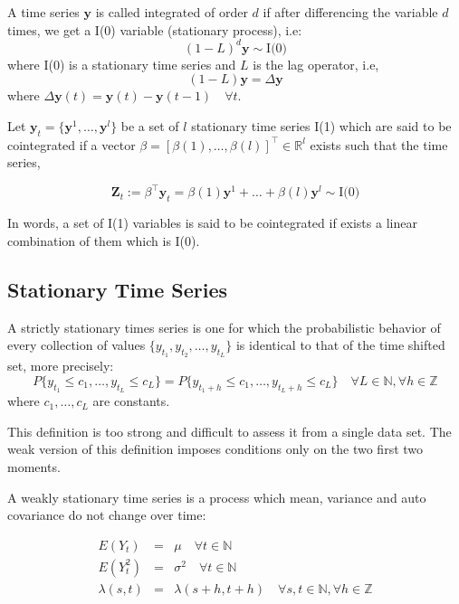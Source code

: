 A time series $\mathbf{y}$ is called integrated of order $d$ if after
differencing the variable $d$ times, we get a I(0) variable (stationary
process), i.e:
\[
(1-L)^d \mathbf{y} \sim \text{I(0)}
\]
\noindent where I(0) is a stationary time series and $L$ is the lag operator, i.e,
\[
(1-L)\mathbf{y} = \Delta \mathbf{y}
\]
\noindent where $\Delta \mathbf{y}(t) = \mathbf{y}(t)  -\mathbf{y}(t-1) \quad \forall t $.


Let $\mathbf{y}_t = \{\mathbf{y}^1, \dots, \mathbf{y}^l\}$ be a set of $l$ stationary time
series I(1) which are said to be cointegrated if a vector
$\beta=[\beta(1),\dots,\beta(l)]^\top \in \mathbb{R}^l$  exists such that the time series,

\begin{equation}
 \mathbf{Z}_t:= \beta^\top \mathbf{y}_t = \beta(1) \mathbf{y}^1 + \dots + \beta(l) \mathbf{y}^l \sim
 \text{I(0)}
\end{equation}

In words, a set of I(1) variables is said to be cointegrated if
exists a linear combination of them which is I(0).

\subsection{Stationary Time Series}

A strictly stationary times series is one for which the probabilistic behavior
of every collection of values $\{y_{t_1},y_{t_2},\dots,y_{t_L}\}$ is identical
to that of the time shifted set, more precisely: \[ P\{y_{t_1} \leq
c_1,\dots,y_{t_L} \leq c_L\} = P\{y_{t_1+h} \leq c_1,\dots,y_{t_L+h}
\leq c_L\}
\quad \forall L \in \mathbb{N}, \forall h \in \mathbb{Z}\] \noindent where
$c_1,\dots,c_L$ are constants.

This definition is too strong and difficult to assess it from a single data
set. The weak version of this definition imposes conditions only on the two
first two moments.

A weakly stationary time series is a process which mean, variance and auto
covariance do not change over time:

\begin{eqnarray*}
E(Y_t) &=& \mu  \quad \forall t \in \mathbb{N} \\ E(Y^2_t) &=&
\sigma^2  \quad \forall t \in \mathbb{N} \\
\lambda(s,t)&=&\lambda(s+h,t+h) \quad \forall s,t \in \mathbb{N},
\forall h \in \mathbb{Z}
\end{eqnarray*}

